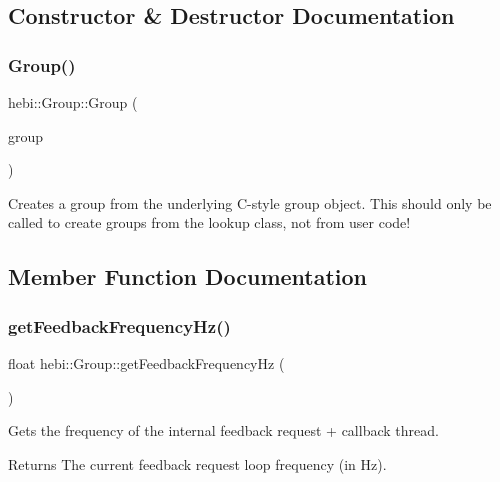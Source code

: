 \subsection{Constructor \& Destructor Documentation}
\mbox{\label{classhebi_1_1Group_a52041e4d07d6d0767c52bb896d125e84}} 
\subsubsection{\texorpdfstring{Group()}{Group()}}
{\footnotesize\ttfamily hebi\+::\+Group\+::\+Group (\begin{DoxyParamCaption}\item[{Hebi\+Group\+Ptr}]{group }\end{DoxyParamCaption})}

Creates a group from the underlying C-\/style group object. This should only be called to create groups from the lookup class, not from user code! 

\subsection{Member Function Documentation}
\mbox{\label{classhebi_1_1Group_a5f8e63952136f4d0fc3b847c838985b9}} 
\subsubsection{\texorpdfstring{get\+Feedback\+Frequency\+Hz()}{getFeedbackFrequencyHz()}}
{\footnotesize\ttfamily float hebi\+::\+Group\+::get\+Feedback\+Frequency\+Hz (\begin{DoxyParamCaption}{ }\end{DoxyParamCaption})}



Gets the frequency of the internal feedback request + callback thread. 

\begin{DoxyReturn}{Returns}
The current feedback request loop frequency (in Hz). 
\end{DoxyReturn}
\mbox{\label{classhebi_1_1Group_a191170df8c2b64e039063e89449b4587}} 
